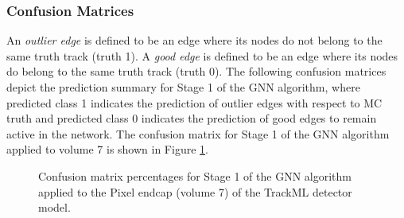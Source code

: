 
\subsubsection{Confusion Matrices}
An \textit{outlier edge} is defined to be an edge where its nodes do not belong to the same truth track (truth 1). A \textit{good edge} is defined to be an edge where its nodes do belong to the same truth track (truth 0). The following confusion matrices depict the prediction summary for Stage 1 of the GNN algorithm, where predicted class 1 indicates the prediction of outlier edges with respect to MC truth and predicted class 0 indicates the prediction of good edges to remain active in the network. The confusion matrix for Stage 1 of the GNN algorithm applied to volume 7 is shown in Figure \ref{fig:confusion-matrix-endcap-stage-1}.

\begin{figure}[htbp]%
    \centering
    \caption{Confusion matrix percentages for Stage 1 of the GNN algorithm applied to the Pixel endcap (volume 7) of the TrackML detector model.}
    \label{fig:confusion-matrix-endcap-stage-1}
\end{figure}

